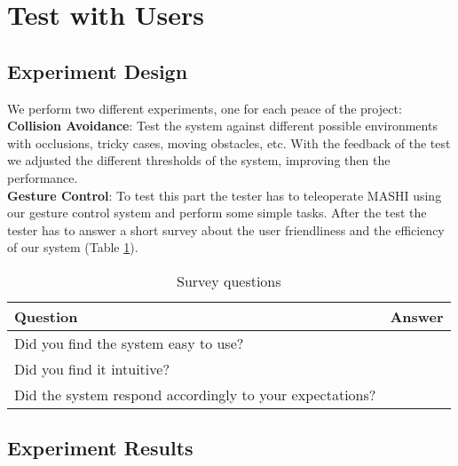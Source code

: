 \section{Test with Users}
\label{sec:test}

\subsection{Experiment Design}
We perform two different experiments, one for each peace of the project:\\


\textbf{Collision Avoidance}: Test the system against different possible environments with occlusions, tricky cases, moving obstacles, etc. With the feedback of the test we adjusted the different thresholds of the system, improving then the performance.\\


\textbf{Gesture Control}: To test this part the tester has to teleoperate MASHI using our gesture control system and perform some simple tasks. After the test the tester has to answer a short survey about the user friendliness and the efficiency of our system (Table \ref{tab:survey}).  

\begin{table}[!h]
	\centering
	\begin{tabular}{|l|l|}
		\hline
		\textbf{Question} & \textbf{Answer}\\
		\hline
		Did you find the system easy to use? & \\
		Did you find it intuitive? 			 & \\
		Did the system respond accordingly to your expectations?  & \\ \hline
	\end{tabular}
	\caption{Survey questions}
	\label{tab:survey}
\end{table}


\subsection{Experiment Results}